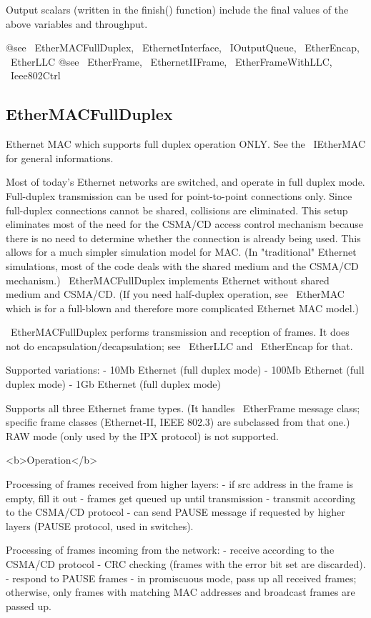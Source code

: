 Output scalars (written in the finish() function) include the final values of
the above variables and throughput.

@see ~EtherMACFullDuplex, ~EthernetInterface, ~IOutputQueue, ~EtherEncap, ~EtherLLC
@see ~EtherFrame, ~EthernetIIFrame, ~EtherFrameWithLLC, ~Ieee802Ctrl

\subsection{EtherMACFullDuplex}


Ethernet MAC which supports full duplex operation ONLY.
See the ~IEtherMAC for general informations.

Most of today's Ethernet networks are switched, and operate
in full duplex mode. Full-duplex transmission can be used for
point-to-point connections only. Since full-duplex connections
cannot be shared, collisions are eliminated. This setup eliminates
most of the need for the CSMA/CD access control mechanism because
there is no need to determine whether the connection is already
being used. This allows for a much simpler simulation model
for MAC. (In "traditional" Ethernet simulations, most of the code
deals with the shared medium and the CSMA/CD mechanism.)
~EtherMACFullDuplex implements Ethernet without shared medium and CSMA/CD.
(If you need half-duplex operation, see ~EtherMAC which is for a full-blown
and therefore more complicated Ethernet MAC model.)

~EtherMACFullDuplex performs transmission and reception of frames.
It does not do encapsulation/decapsulation; see ~EtherLLC and ~EtherEncap
for that.

Supported variations:
- 10Mb Ethernet (full duplex mode)
- 100Mb Ethernet (full duplex mode)
- 1Gb Ethernet (full duplex mode)

Supports all three Ethernet frame types. (It handles ~EtherFrame message class;
specific frame classes (Ethernet-II, IEEE 802.3) are subclassed from that one.)
RAW mode (only used by the IPX protocol) is not supported.

<b>Operation</b>

Processing of frames received from higher layers:
- if src address in the frame is empty, fill it out
- frames get queued up until transmission
- transmit according to the CSMA/CD protocol
- can send PAUSE message if requested by higher layers (PAUSE protocol,
  used in switches).

Processing of frames incoming from the network:
- receive according to the CSMA/CD protocol
- CRC checking (frames with the error bit set are discarded).
- respond to PAUSE frames
- in promiscuous mode, pass up all received frames;
  otherwise, only frames with matching MAC addresses and
  broadcast frames are passed up.

